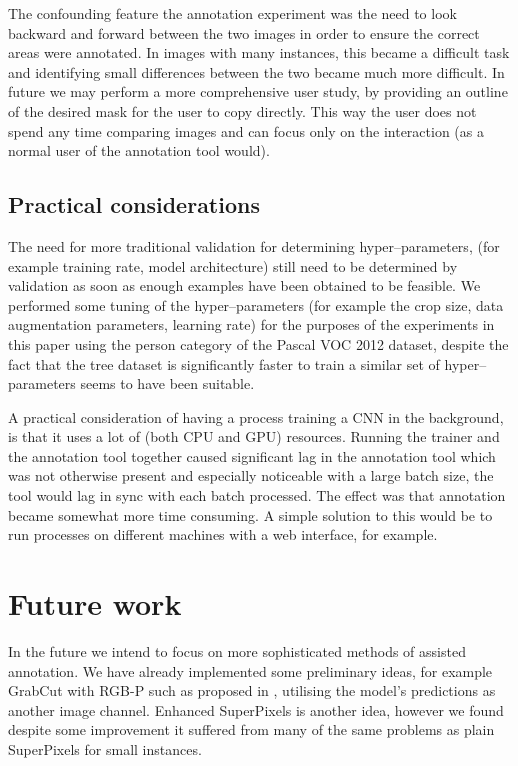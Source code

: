 The confounding feature the annotation experiment was the need to look backward and forward between the two images in order to ensure the correct areas were annotated. In images with many instances, this became a difficult task and identifying small differences between the two became much more difficult. In future we may perform a more comprehensive user study, by providing an outline of the desired mask for the user to copy directly. This way the user does not spend any time comparing images and can focus only on the interaction (as a normal user of the annotation tool would).


\subsection{Practical considerations}

The need for more traditional validation for determining hyper--parameters, (for example training rate, model architecture) still need to be determined by validation as soon as enough examples have been obtained to be feasible. We performed some tuning of the hyper--parameters (for example the crop size, data augmentation parameters, learning rate) for the purposes of the experiments in this paper using the person category of the Pascal \gls{VOC} 2012 dataset, despite the fact that the tree dataset is significantly faster to train a similar set of hyper--parameters seems to have been suitable.


A practical consideration of having a process training a \gls{CNN} in the background, is that it uses a lot of (both \gls{CPU} and \gls{GPU}) resources. Running the trainer and the annotation tool together caused significant lag in the annotation tool which was not otherwise present and especially noticeable with a large batch size, the tool would lag in sync with each batch processed. The effect was that annotation became somewhat more time consuming. A simple solution to this would be to run processes on different machines with a web interface, for example.


\section{Future work}


In the future we intend to focus on more sophisticated methods of assisted annotation. We have already implemented some preliminary ideas, for example GrabCut with RGB-P such as proposed in \cite{Xu2016a}, utilising the model's predictions as another image channel.  Enhanced SuperPixels is another idea, however we found despite some improvement it suffered from many of the same problems as plain SuperPixels for small instances. 

